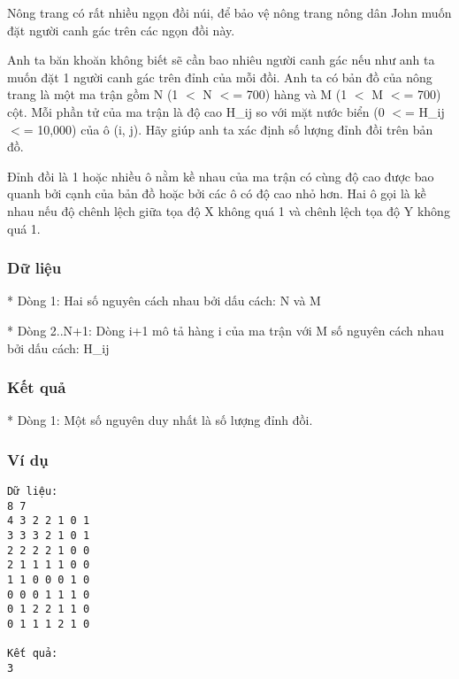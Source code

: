 



   Nông trang có rất nhiều ngọn đồi núi, để bảo vệ nông trang nông dân John muốn đặt người canh gác trên các ngọn đồi này.  

   Anh ta băn khoăn không biết sẽ cần bao nhiêu người canh gác nếu như anh ta muốn đặt 1 người canh gác trên đỉnh của mỗi đồi. Anh ta có bản đồ của nông trang là một ma trận gồm N (1 $<$ N $<$= 700) hàng và M (1 $<$ M $<$= 700) cột. Mỗi phần tử của ma trận là độ cao H\_ij so với mặt nước biển (0 $<$= H\_ij $<$= 10,000) của ô (i, j). Hãy giúp anh ta xác định số lượng đỉnh đồi trên bản đồ.  

   Đỉnh đồi là 1 hoặc nhiều ô nằm kề nhau của ma trận có cùng độ cao được bao quanh bởi cạnh của bản đồ hoặc bởi các ô có độ cao nhỏ hơn. Hai ô gọi là kề nhau nếu độ chênh lệch giữa tọa độ X không quá 1 và chênh lệch tọa độ Y không quá 1.  

\subsubsection{   Dữ liệu  }

   * Dòng 1: Hai số nguyên cách nhau bởi dấu cách: N và M  

   * Dòng 2..N+1: Dòng i+1 mô tả hàng i của ma trận với M số nguyên cách nhau bởi dấu cách: H\_ij  

\subsubsection{   Kết quả  }

   * Dòng 1: Một số nguyên duy nhất là số lượng đỉnh đồi.  

\subsubsection{   Ví dụ  }
\begin{verbatim}
Dữ liệu:
8 7
4 3 2 2 1 0 1
3 3 3 2 1 0 1
2 2 2 2 1 0 0
2 1 1 1 1 0 0
1 1 0 0 0 1 0
0 0 0 1 1 1 0
0 1 2 2 1 1 0
0 1 1 1 2 1 0

Kết quả:
3
\end{verbatim}